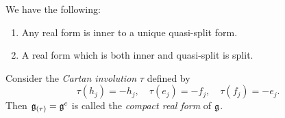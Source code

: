 \begin{corollary}
  We have the following:
  \begin{enumerate}
    \item Any real form is inner to a unique
      quasi-split form.
    \item A real form which is both
      inner and quasi-split is split.
  \end{enumerate}
\end{corollary}

\begin{example}\label{ex:cartan-involution}
  Consider the \emph{Cartan involution}
  $\tau$ defined by
  \[
    \tau(h_j) = -h_j, \quad
    \tau(e_j) = -f_j, \quad
    \tau(f_j) = -e_j.
  \]
  Then $\mathfrak{g}_{(\tau)} = \mathfrak{g}^c$
  is called the \emph{compact real form}
  of $\mathfrak{g}$.
\end{example}
